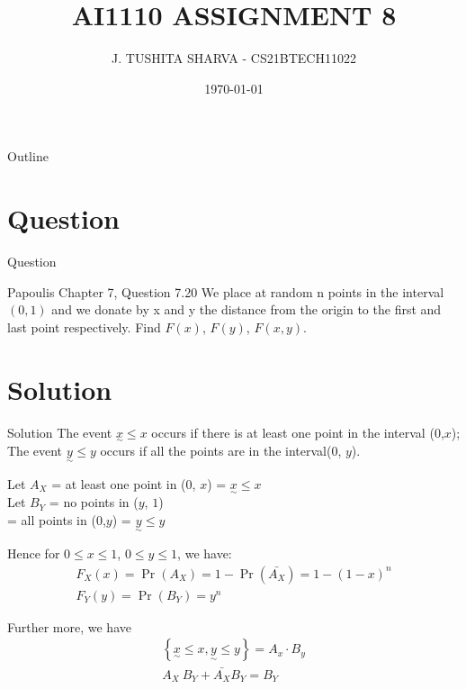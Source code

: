 \documentclass{beamer}
\title{AI1110 ASSIGNMENT 8}
\author{J. TUSHITA SHARVA - CS21BTECH11022}
\date{\today}
\providecommand{\pr}[1]{\ensuremath{\Pr\left(#1\right)}}
\providecommand{\brak}[1]{\ensuremath{\left(#1\right)}}
\providecommand{\cbrak}[1]{\ensuremath{\left\{#1\right\}}}
\numberwithin{equation}{subsection}
\begin{document}
\begin{frame}
    \titlepage 
\end{frame}

\logo{}

\begin{frame}{Outline}
    \tableofcontents
\end{frame}


\section{Question}
\begin{frame}{Question}
    \begin{block}{Papoulis Chapter 7, Question 7.20}
        We place at random n points in the interval $(0,1)$ and we donate by x and y the distance from the origin to the first and last point respectively. Find $F(x)$, $F(y)$, $F(x,y)$.
    \end{block}
\end{frame}

\section{Solution}
\begin{frame}{Solution}
    The event {${\underset{\sim}{x}\leq x}$} occurs if there is at least one point in the interval ($0$,$x$); The event {${\underset{\sim}{y}\leq y}$} occurs if all the points are in the interval($0$, $y$).

    Let $A_X$ = {at least one point in ($0$, $x$)} = {$\underset{\sim}{x} \leq x$}\\
    Let $B_Y$ = no points in ($y$, $1$) \\ 
    = all points in ($0$,$y$) = $\underset{\sim}{y} \leq y$

Hence for $0 \leq x \leq 1$, $0 \leq y \leq 1$, we have:
\begin{align}
    F_X(x) = \pr{A_X} = 1 - \pr{\bar{A_X}} = 1-\brak{1-x}^n\\
    F_Y\brak{y} = \pr{B_Y} = y^n 
\end{align}

Further more, we have
\begin{align}
    \cbrak{\underset{\sim}{x} \leq x, \underset{\sim}{y} \leq y} = A_x \cdot B_y\\
    A_X\ B_Y + \bar{A_X}B_Y = B_Y
\end{align}
\end{frame}
\end{document}
